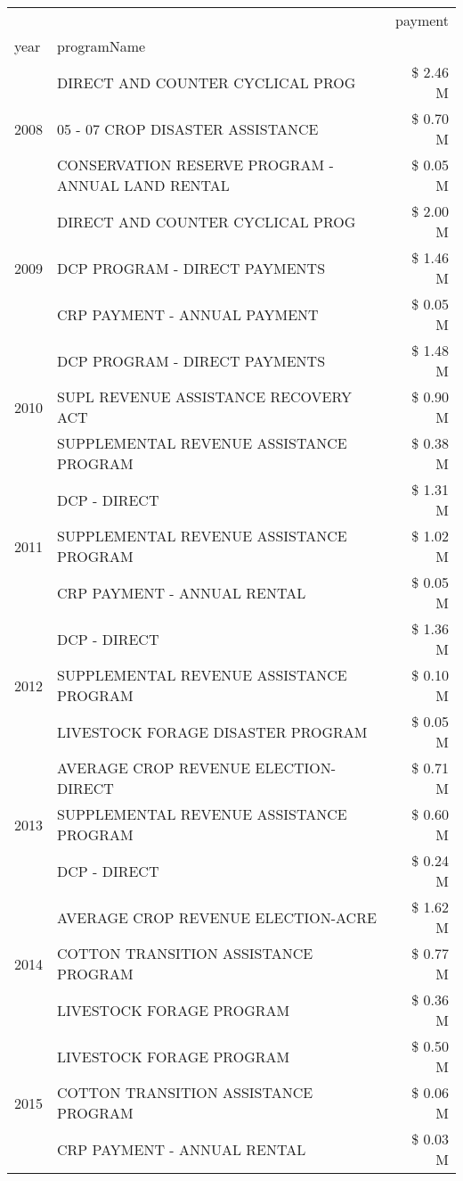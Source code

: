 \begin{tabular}{llr}
\toprule
 &  & payment \\
year & programName &  \\
\midrule
\multirow[t]{3}{*}{2008} & DIRECT AND COUNTER CYCLICAL PROG & \$ 2.46 M \\
 & 05 - 07 CROP DISASTER ASSISTANCE & \$ 0.70 M \\
 & CONSERVATION RESERVE PROGRAM - ANNUAL LAND RENTAL & \$ 0.05 M \\
\cline{1-3}
\multirow[t]{3}{*}{2009} & DIRECT AND COUNTER CYCLICAL PROG & \$ 2.00 M \\
 & DCP PROGRAM - DIRECT PAYMENTS & \$ 1.46 M \\
 & CRP PAYMENT - ANNUAL PAYMENT & \$ 0.05 M \\
\cline{1-3}
\multirow[t]{3}{*}{2010} & DCP PROGRAM - DIRECT PAYMENTS & \$ 1.48 M \\
 & SUPL REVENUE ASSISTANCE RECOVERY ACT & \$ 0.90 M \\
 & SUPPLEMENTAL REVENUE ASSISTANCE PROGRAM & \$ 0.38 M \\
\cline{1-3}
\multirow[t]{3}{*}{2011} & DCP - DIRECT & \$ 1.31 M \\
 & SUPPLEMENTAL REVENUE ASSISTANCE PROGRAM & \$ 1.02 M \\
 & CRP PAYMENT - ANNUAL RENTAL & \$ 0.05 M \\
\cline{1-3}
\multirow[t]{3}{*}{2012} & DCP - DIRECT & \$ 1.36 M \\
 & SUPPLEMENTAL REVENUE ASSISTANCE PROGRAM & \$ 0.10 M \\
 & LIVESTOCK FORAGE DISASTER PROGRAM & \$ 0.05 M \\
\cline{1-3}
\multirow[t]{3}{*}{2013} & AVERAGE CROP REVENUE ELECTION-DIRECT & \$ 0.71 M \\
 & SUPPLEMENTAL REVENUE ASSISTANCE PROGRAM & \$ 0.60 M \\
 & DCP - DIRECT & \$ 0.24 M \\
\cline{1-3}
\multirow[t]{3}{*}{2014} & AVERAGE CROP REVENUE ELECTION-ACRE & \$ 1.62 M \\
 & COTTON TRANSITION ASSISTANCE PROGRAM & \$ 0.77 M \\
 & LIVESTOCK FORAGE PROGRAM & \$ 0.36 M \\
\cline{1-3}
\multirow[t]{3}{*}{2015} & LIVESTOCK FORAGE PROGRAM & \$ 0.50 M \\
 & COTTON TRANSITION ASSISTANCE PROGRAM & \$ 0.06 M \\
 & CRP PAYMENT - ANNUAL RENTAL & \$ 0.03 M \\

\end{tabular}
